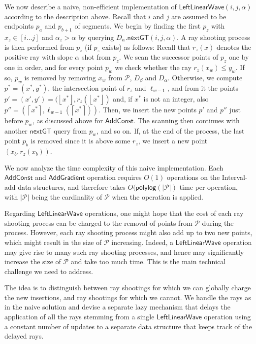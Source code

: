 \documentclass[a4paper,UKenglish,cleveref, autoref, thm-restate]{lipics-v2021}
\newcommand{\AC}{\mathsf{AddConst}}
\newcommand{\AG}{\mathsf{AddGradient}}
\newcommand{\LLW}{\mathsf{LeftLinearWave}}
\newcommand{\local}{\text{short }}
\newcommand{\longrange}{\text{long }}
\newcommand{\nextGT}{\mathsf{nextGT}}
\renewcommand{\P}{\mathcal{P}}
\newcommand{\ray}{r}
\newcommand{\ceil}[1]{\left\lceil{#1}\right\rceil}
\newcommand{\floor}[1]{\left\lfloor{#1}\right\rfloor}
\newcommand{\polylog}{\mathsf{polylog}}
\begin{document}
We now describe a naive, non-efficient implementation of $\LLW(i,j,\alpha)$ according to the description above.  
Recall that $i$ and $j$ are assumed to be endpoints $p_a$ and $p_{b+1}$ of segments. 
We begin by finding the first $p_z$ with $x_z\in[i\ldots j]$ and $\alpha_z>\alpha$ by querying $D_{\alpha}.\nextGT(i,j,\alpha)$. A ray shooting process is then performed from $p_z$ (if $p_z$ exists) as follows:
Recall that $\ray_z(x)$ denotes the positive ray with slope $\alpha$ shot from $p_z$.
We scan the successor points of $p_z$ one by one in order, and for every point $p_w$ we check whether the ray $\ray_z(x_w)\leq y_w$.
If so, $p_w$ is removed by  removing $x_w$ from $\P$, $D_{\beta}$ and $D_{\alpha}$.
Otherwise, we compute $p^*=(x^*,y^*)$, the intersection point of $\ray_z$ and $\ell_{w-1}$, and from it the points $p' = (x',y')=(\floor{x^*},\ray_z(\floor{x^*})$ and, if $x^*$ is not an integer, also $p''=(\ceil{x^*},\ell_{w-1}(\ceil{x^*}))$.
Then, we insert the new points $p'$ and $p''$ just before $p_w$, as discussed above for $\AC$.
The scanning then continues with another $\nextGT$ query from $p_w$, and so on.
If, at the end of the process, the last point $p_b$ is removed since it is above some $\ray_z$, we insert a new point $(x_b,\ray_z(x_b))$.

We now analyze the time complexity of this naive implementation. Each $\AC$ and $\AG$ operation requires $O(1)$ operations on the Interval-add data structures, and therefore takes $O(\polylog(|\P|)$ time per operation, with $|\P|$ being the cardinality of $\P$ when the operation is applied. 

Regarding $\LLW$ operations, one might hope that the cost of each ray shooting process can be charged to the removal of points from $\P$ during the process. However, each ray shooting process might also add up to two new points, which might result in the size of $\P$ increasing. 
Indeed, a $\LLW$ operation may give rise to many such ray shooting processes, and hence may significantly increase the size of $\P$ and take too much time. This is the main technical challenge we need to address.

The idea is to  distinguish between {\em \longrange}ray shootings for which we can globally charge the new insertions, and {\em \local}ray shootings for which we cannot. We handle the \longrange rays as in the naive solution and devise a separate lazy mechanism that delays the application of all the \local rays stemming from a single $\LLW$ operation using a constant number of updates to a separate data structure that keeps track of the delayed rays. 
\end{document}
